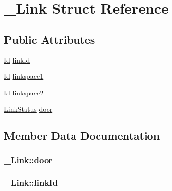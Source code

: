 \hypertarget{struct__Link}{}\section{\+\_\+\+Link Struct Reference}
\label{struct__Link}
\subsection*{Public Attributes}
\begin{DoxyCompactItemize}
\item 
\hyperlink{types_8h_a845e604fb28f7e3d97549da3448149d3}{Id} \hyperlink{struct__Link_a3c2eb94d5f272bf373c113a868e3d367}{link\+Id}
\item 
\hyperlink{types_8h_a845e604fb28f7e3d97549da3448149d3}{Id} \hyperlink{struct__Link_a851b2cb675c25aaa73ebbaa58b8db1a2}{linkspace1}
\item 
\hyperlink{types_8h_a845e604fb28f7e3d97549da3448149d3}{Id} \hyperlink{struct__Link_aac79e76abc5512cd08a381eb835d59f0}{linkspace2}
\item 
\hyperlink{types_8h_aa60f669816b146d6373c62d9625e52ad}{Link\+Status} \hyperlink{struct__Link_ab4d6f65f126e9a41440828d2317b7a79}{door}
\end{DoxyCompactItemize}


\subsection{Member Data Documentation}
\subsubsection[{\texorpdfstring{door}{door}}]{ \+\_\+\+Link\+::door}\hypertarget{struct__Link_ab4d6f65f126e9a41440828d2317b7a79}{}\label{struct__Link_ab4d6f65f126e9a41440828d2317b7a79}
\subsubsection[{\texorpdfstring{link\+Id}{linkId}}]{ \+\_\+\+Link\+::link\+Id}\hypertarget{struct__Link_a3c2eb94d5f272bf373c113a868e3d367}{}\label{struct__Link_a3c2eb94d5f272bf373c113a868e3d367}
